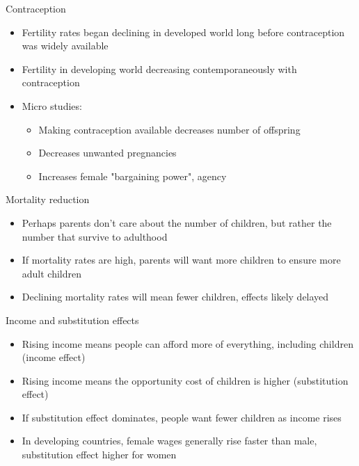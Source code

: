 \documentclass[10pt]{beamer}
\begin{document}
\begin{frame}[label={sec:org53de3e1}]{}
\alert{Contraception}
\begin{itemize}
\item Fertility rates began declining in developed world long before contraception was widely available
\item Fertility in developing world decreasing contemporaneously with contraception
\item Micro studies:
\begin{itemize}
\item Making contraception available decreases number of offspring
\item Decreases unwanted pregnancies
\item Increases female "bargaining power", agency
\end{itemize}
\end{itemize}
\end{frame}

\begin{frame}[label={sec:orgeeb7e43}]{}
\alert{Mortality reduction}
\begin{itemize}
\item Perhaps parents don't care about the number of children, but rather the number that survive to adulthood
\item If mortality rates are high, parents will want more children to ensure more adult children
\item Declining mortality rates will mean fewer children, effects likely delayed
\end{itemize}
\end{frame}

\begin{frame}[label={sec:orgac12f58}]{}
\alert{Income and substitution effects}
\begin{itemize}
\item Rising income means people can afford more of everything, including children (income effect)
\item Rising income means the opportunity cost of children is higher (substitution effect)
\item If substitution effect dominates, people want fewer children as income rises
\item In developing countries, female wages generally rise faster than male, substitution effect higher for women
\end{itemize}
\end{frame}
\end{document}
